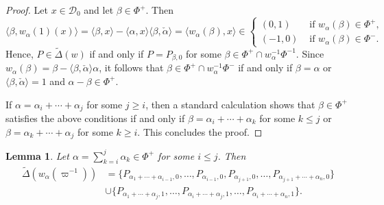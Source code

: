 \documentclass{article}
\newcommand{\calpha}{\check{\alpha}}
\theoremstyle{plain}
\newtheorem{lemma}[theorem]{Lemma}
\theoremstyle{definition}
\begin{document}
    \begin{proof}
        Let $x\in\mathcal{D}_0$ and let $\beta\in\Phi^+$. Then
        \begin{equation*}
            \langle\beta,w_\alpha(1)(x)\rangle=\langle\beta,x\rangle-\langle\alpha,x\rangle\langle\beta,\calpha\rangle=\langle w_\alpha(\beta),x\rangle\in
            \begin{cases}
                (0,1) &\text{ if } w_\alpha(\beta)\in\Phi^+,\\
                (-1,0) &\text{ if } w_\alpha(\beta)\in\Phi^-.
            \end{cases}
        \end{equation*}
        Hence, $P\in\widetilde{\Delta}(w)$ if and only if $P=P_{\beta,0}$ for some $\beta\in\Phi^+\cap w_\alpha^{-1}\Phi^{-1}$. Since $w_\alpha(\beta)=\beta-\langle\beta,\calpha\rangle\alpha$, it follows that $\beta\in\Phi^+\cap w_\alpha^{-1}\Phi^-$ if and only if $\beta=\alpha$ or $\langle\beta,\calpha\rangle=1$ and $\alpha-\beta\in\Phi^+$.
        
        If $\alpha=\alpha_i+\cdots+\alpha_j$ for some $j\geq i$, then a standard calculation shows that $\beta\in\Phi^+$ satisfies the above conditions if and only if $\beta=\alpha_i+\cdots+\alpha_k$ for some $k\leq j$ or $\beta=\alpha_k+\cdots+\alpha_j$ for some $k\geq i$. This concludes the proof.
    \end{proof}

    \begin{lemma}\label{lem_wvarpi}
        Let $\alpha=\sum_{k=i}^{j}\alpha_k\in\Phi^+$ for some $i\leq j$. Then
        \begin{align*}
            \widetilde{\Delta}(w_\alpha(\varpi^{-1}))&=\{P_{\alpha_1+\cdots+\alpha_{i-1},0},\ldots,P_{\alpha_{i-1},0},P_{\alpha_{j+1},0},\ldots,P_{\alpha_{j+1}+\cdots+\alpha_{n},0}\}\\
            &\cup\{P_{\alpha_1+\cdots+\alpha_j,1},\ldots,P_{\alpha_i+\cdots+\alpha_{j},1},\ldots,P_{\alpha_i+\cdots+\alpha_n,1}\}.
        \end{align*}
    \end{lemma}
\end{document}
